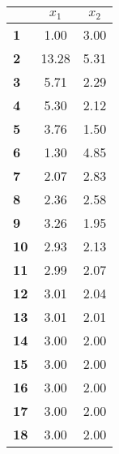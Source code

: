 \begin{small}\begin{tabular}{|l|c|c|}
\hline
&\textbf{$x_1$}&\textbf{$x_2$}\\\hline
\textbf{1}&1.00&3.00\\\hline
\textbf{2}&13.28&5.31\\\hline
\textbf{3}&5.71&2.29\\\hline
\textbf{4}&5.30&2.12\\\hline
\textbf{5}&3.76&1.50\\\hline
\textbf{6}&1.30&4.85\\\hline
\textbf{7}&2.07&2.83\\\hline
\textbf{8}&2.36&2.58\\\hline
\textbf{9}&3.26&1.95\\\hline
\textbf{10}&2.93&2.13\\\hline
\textbf{11}&2.99&2.07\\\hline
\textbf{12}&3.01&2.04\\\hline
\textbf{13}&3.01&2.01\\\hline
\textbf{14}&3.00&2.00\\\hline
\textbf{15}&3.00&2.00\\\hline
\textbf{16}&3.00&2.00\\\hline
\textbf{17}&3.00&2.00\\\hline
\textbf{18}&3.00&2.00\\\hline
\end{tabular}
\end{small}